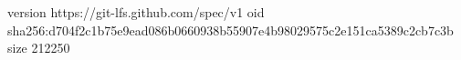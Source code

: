 version https://git-lfs.github.com/spec/v1
oid sha256:d704f2c1b75e9ead086b0660938b55907e4b98029575c2e151ca5389c2cb7c3b
size 212250
